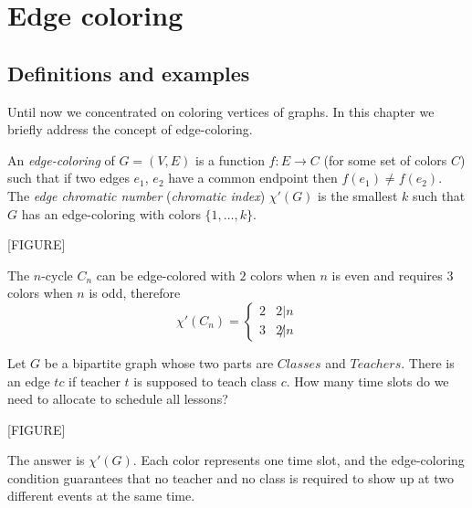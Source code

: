 \chapter{Edge coloring}

\section{Definitions and examples}

Until now we concentrated on coloring vertices of graphs. In this chapter we briefly address the concept of edge-coloring.

\begin{definition}
An \emph{edge-coloring} of $G=(V,E)$ is a function $f:E\rightarrow C$ (for some set of colors $C$) such that if two edges $e_1$, $e_2$ have a common endpoint then $f(e_1)\neq f(e_2)$. The \emph{edge chromatic number} (\emph{chromatic index}) $\chi'(G)$ is the smallest $k$ such that $G$ has an edge-coloring with colors $\{1,\dots,k\}$.
\end{definition}

[FIGURE]

\begin{example}[Cycles]
The $n$-cycle $C_n$ can be edge-colored with $2$ colors when $n$ is even and requires $3$ colors when $n$ is odd, therefore
$$\chi'(C_n)=
\begin {cases}
2 & 2|n\\
3 & 2\not|n
\end {cases}$$
\end{example}

\begin{example}[Scheduling]
Let $G$ be a bipartite graph whose two parts are $Classes$ and $Teachers$. There is an edge $tc$ if teacher $t$ is supposed to teach class $c$. How many time slots do we need to allocate to schedule all lessons?

[FIGURE]

The answer is $\chi'(G)$. Each color represents one time slot, and the edge-coloring condition guarantees that no teacher and no class is required to show up at two different events at the same time.
\end{example}

